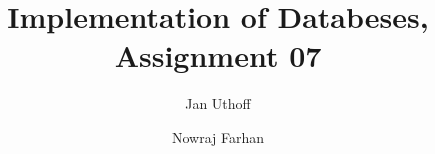 \documentclass{exercisesheet}
\title{Implementation of Databeses, Assignment 07}
\author{
    Jan Uthoff
    \and
    Nowraj Farhan
}
\begin{document}
\maketitle

\pointtable


\end{document}
